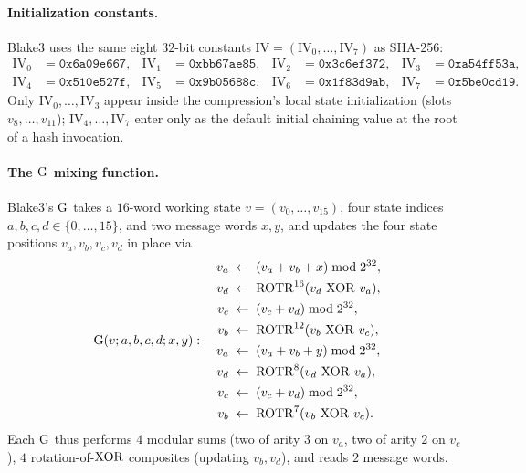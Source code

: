 \paragraph{Initialization constants.}
Blake3 uses the same eight $32$-bit constants $\mathrm{IV} = (\mathrm{IV}_0,
\dots, \mathrm{IV}_7)$ as SHA-256:
\begin{align*}
\mathrm{IV}_0 &= \texttt{0x6a09e667}, & \mathrm{IV}_1 &= \texttt{0xbb67ae85}, &
\mathrm{IV}_2 &= \texttt{0x3c6ef372}, & \mathrm{IV}_3 &= \texttt{0xa54ff53a}, \\
\mathrm{IV}_4 &= \texttt{0x510e527f}, & \mathrm{IV}_5 &= \texttt{0x9b05688c}, &
\mathrm{IV}_6 &= \texttt{0x1f83d9ab}, & \mathrm{IV}_7 &= \texttt{0x5be0cd19}.
\end{align*}
Only $\mathrm{IV}_0, \dots, \mathrm{IV}_3$ appear inside the
compression's local state initialization (slots $v_8, \dots, v_{11}$);
$\mathrm{IV}_4, \dots, \mathrm{IV}_7$ enter only as the default initial
chaining value at the root of a hash invocation.

\paragraph{The $\operatorname{G}$ mixing function.}
Blake3's $\operatorname{G}$ takes a $16$-word working state
$v = (v_0, \dots, v_{15})$, four state indices $a, b, c, d \in
\{0, \dots, 15\}$, and two message words $x, y$, and updates the four
state positions $v_a, v_b, v_c, v_d$ in place via
\begin{equation}\label{eq:g-mix}
\operatorname{G}(v; a, b, c, d; x, y):
\quad
\begin{aligned}
v_a &\;\leftarrow\; (v_a + v_b + x) \bmod 2^{32}, \\
v_d &\;\leftarrow\; \operatorname{ROTR}^{16}(v_d \,\operatorname{XOR}\, v_a), \\
v_c &\;\leftarrow\; (v_c + v_d) \bmod 2^{32}, \\
v_b &\;\leftarrow\; \operatorname{ROTR}^{12}(v_b \,\operatorname{XOR}\, v_c), \\
v_a &\;\leftarrow\; (v_a + v_b + y) \bmod 2^{32}, \\
v_d &\;\leftarrow\; \operatorname{ROTR}^{8}(v_d \,\operatorname{XOR}\, v_a), \\
v_c &\;\leftarrow\; (v_c + v_d) \bmod 2^{32}, \\
v_b &\;\leftarrow\; \operatorname{ROTR}^{7}(v_b \,\operatorname{XOR}\, v_c).
\end{aligned}
\end{equation}
Each $\operatorname{G}$ thus performs $4$ modular sums (two of arity $3$ on
$v_a$, two of arity $2$ on $v_c$), $4$ rotation-of-$\operatorname{XOR}$ composites
(updating $v_b, v_d$), and reads $2$ message words.

